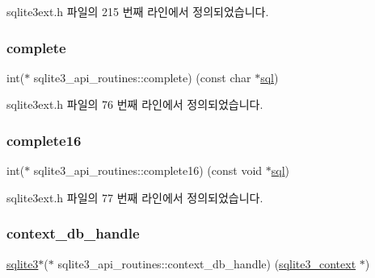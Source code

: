 sqlite3ext.\+h 파일의 215 번째 라인에서 정의되었습니다.

\mbox{\label{structsqlite3__api__routines_acf6be6ede31fda32f4f0193aafce0ba3}} 
\subsubsection{\texorpdfstring{complete}{complete}}
{\footnotesize\ttfamily int($\ast$ sqlite3\+\_\+api\+\_\+routines\+::complete) (const char $\ast$\hyperlink{structsqlite3__api__routines_a0d4c8662baae0bd626f0ee334183e69e}{sql})}



sqlite3ext.\+h 파일의 76 번째 라인에서 정의되었습니다.

\mbox{\label{structsqlite3__api__routines_a12b69b88bc84fba6fe97cefa4b979eff}} 
\subsubsection{\texorpdfstring{complete16}{complete16}}
{\footnotesize\ttfamily int($\ast$ sqlite3\+\_\+api\+\_\+routines\+::complete16) (const void $\ast$\hyperlink{structsqlite3__api__routines_a0d4c8662baae0bd626f0ee334183e69e}{sql})}



sqlite3ext.\+h 파일의 77 번째 라인에서 정의되었습니다.

\mbox{\label{structsqlite3__api__routines_a0d87c9f2bc88725d9b29080202265c84}} 
\subsubsection{\texorpdfstring{context\+\_\+db\+\_\+handle}{context\_db\_handle}}
{\footnotesize\ttfamily \hyperlink{sqlite3_8h_a0ef6f2646262c8a9b24368d8ac140f69}{sqlite3}$\ast$($\ast$ sqlite3\+\_\+api\+\_\+routines\+::context\+\_\+db\+\_\+handle) (\hyperlink{sqlite3_8h_a3b519553ffec8fc42b2356f5b1ebdc57}{sqlite3\+\_\+context} $\ast$)}




